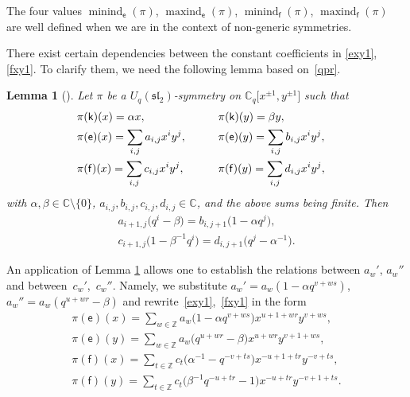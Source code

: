 \documentclass[pdftex]{sigma}
\numberwithin{equation}{section}
\newtheorem{Lemma}[Theorem]{Lemma}
\begin{document}
The four values $\operatorname{minind}_\mathsf{e}(\pi)$, $\operatorname{maxind}_\mathsf{e}(\pi)$, $\operatorname{minind}_\mathsf{f}(\pi)$, $\operatorname{maxind}_\mathsf{f}(\pi)$ are well defined when we are in the context of non-generic symmetries.

There exist certain dependencies between the constant coefficients in \eqref{exy1}, \eqref{fxy1}. To clarify them, we need the following lemma based on~\eqref{qpr}.

\begin{Lemma}[{\cite[Lemma 4.2]{S}}]\label{ratios} Let $\pi$ be a $U_q(\mathfrak{sl}_2)$-symmetry on $\mathbb{C}_q\big[x^{\pm 1},y^{\pm 1}\big]$ such that
\begin{alignat}{3}
&\pi(\mathsf{k})(x)=\alpha x,\qquad && \pi(\mathsf{k})(y) =\beta y, &\notag\\
& \pi(\mathsf{e})(x) =\sum_{i,j}a_{i,j}x^iy^j, \qquad && \pi(\mathsf{e})(y) =\sum_{i,j}b_{i,j}x^iy^j, &\label{ex_y}\\
& \pi(\mathsf{f})(x) =\sum_{i,j}c_{i,j}x^iy^j,\qquad && \pi(\mathsf{f})(y) =\sum_{i,j}d_{i,j}x^iy^j, &\label{fx_y}
\end{alignat}
with $\alpha,\beta\in\mathbb{C}{\setminus}\{0\}$, $a_{i,j},b_{i,j},c_{i,j},d_{i,j}\in\mathbb{C}$, and the above sums being finite. Then
\begin{gather*}
a_{i+1,j}\big(q^i-\beta\big) =b_{i,j+1}\big(1-\alpha q^j\big),\\
 c_{i+1,j}\big(1-\beta^{-1}q^i\big) =d_{i,j+1}\big(q^j-\alpha^{-1}\big).
\end{gather*}
\end{Lemma}

An application of Lemma \ref{ratios} allows one to establish the relations between $a_w'$, $a_w''$ and between~$c_w'$,~$c_w''$. Namely, we substitute $a_w'=a_w(1-\alpha q^{v+ws})$, $a_w''=a_w(q^{u+wr}-\beta)$ and rewrite~\eqref{exy1},~\eqref{fxy1} in the form
\begin{gather}
\pi(\mathsf{e})(x) =\sum_{w\in\mathbb{Z}}a_w\big(1-\alpha q^{v+ws}\big)x^{u+1+wr}y^{v+ws},\label{ex2}\\
\pi(\mathsf{e})(y) =\sum_{w\in\mathbb{Z}}a_w\big(q^{u+wr}-\beta\big)x^{u+wr}y^{v+1+ws}, \label{ey2}\\
\pi(\mathsf{f})(x) =\sum_{t\in\mathbb{Z}}c_t\big(\alpha^{-1}-q^{-v+ts}\big)x^{-u+1+tr}y^{-v+ts}, \label{fx2}\\
\pi(\mathsf{f})(y) =\sum_{t\in\mathbb{Z}}c_t\big(\beta^{-1}q^{-u+tr}-1\big)x^{-u+tr}y^{-v+1+ts}. \label{fy2}
\end{gather}
\end{document}
